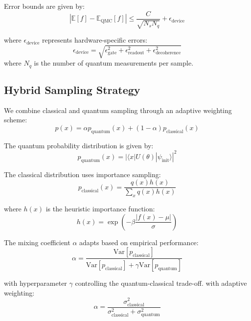 \documentclass{article}
\begin{document}
Error bounds are given by:
\begin{equation}
|\mathbb{E}[f] - \mathbb{E}_{\text{QMC}}[f]| \leq \frac{C}{\sqrt{N_s N_q}} + \epsilon_{\text{device}}
\end{equation}

where $\epsilon_{\text{device}}$ represents hardware-specific errors:
\begin{equation}
\epsilon_{\text{device}} = \sqrt{\epsilon_{\text{gate}}^2 + \epsilon_{\text{readout}}^2 + \epsilon_{\text{decoherence}}^2}
\end{equation}
where $N_q$ is the number of quantum measurements per sample.

\subsection{Hybrid Sampling Strategy}
We combine classical and quantum sampling through an adaptive weighting scheme:
\begin{equation}
p(x) = \alpha p_{\text{quantum}}(x) + (1-\alpha)p_{\text{classical}}(x)
\end{equation}

The quantum probability distribution is given by:
\begin{equation}
p_{\text{quantum}}(x) = |\langle x|U(\theta)|\psi_{\text{init}}\rangle|^2
\end{equation}

The classical distribution uses importance sampling:
\begin{equation}
p_{\text{classical}}(x) = \frac{q(x)h(x)}{\sum_x q(x)h(x)}
\end{equation}

where $h(x)$ is the heuristic importance function:
\begin{equation}
h(x) = \exp\left(-\beta \frac{|f(x) - \mu|}{\sigma}\right)
\end{equation}

The mixing coefficient $\alpha$ adapts based on empirical performance:
\begin{equation}
\alpha = \frac{\text{Var}[p_{\text{classical}}]}{\text{Var}[p_{\text{classical}}] + \gamma \text{Var}[p_{\text{quantum}}]}
\end{equation}

with hyperparameter $\gamma$ controlling the quantum-classical trade-off.
with adaptive weighting:
\begin{equation}
\alpha = \frac{\sigma_{\text{classical}}^2}{\sigma_{\text{classical}}^2 + \sigma_{\text{quantum}}^2}
\end{equation}
\end{document}
